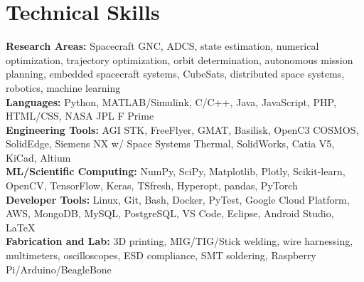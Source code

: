 \documentclass[letterpaper,11pt]{article}
\newcommand{\shiftleft}[2]{\makebox[0pt][r]{\makebox[#1][l]{#2}}}
\newcommand{\cvIcon}[1]{\BeginAccSupp{ActualText={}}#1\EndAccSupp{}}
\def\shiftleft#1#2{}%
\def\faWrench{}%
\begin{document}
\section[Technical Skills]{\shiftleft{18pt}{\cvIcon{\faWrench}}Technical Skills}
 \begin{itemize}[leftmargin=0.15in, label={}]
    \small{\item{
     \textbf{Research Areas:}{ Spacecraft GNC, ADCS, state estimation, numerical optimization, trajectory optimization, orbit determination, autonomous mission planning, embedded spacecraft systems, CubeSats, distributed space systems, robotics, machine learning} \\
     \vspace{2pt}
     \textbf{Languages:}{ Python, MATLAB/Simulink, C/C++, Java, JavaScript, PHP, HTML/CSS, NASA JPL F Prime} \\
     \vspace{2pt}
     \textbf{Engineering Tools:}{ AGI STK, FreeFlyer, GMAT, Basilisk, OpenC3 COSMOS, SolidEdge, Siemens NX w/ Space Systems Thermal, SolidWorks, Catia V5, KiCad, Altium} \\
     \vspace{2pt}
     \textbf{ML/Scientific Computing:}{ NumPy, SciPy, Matplotlib, Plotly, Scikit-learn, OpenCV, TensorFlow, Keras, TSfresh, Hyperopt, pandas, PyTorch} \\
     \vspace{2pt}
     \textbf{Developer Tools:}{ Linux, Git, Bash, Docker, PyTest, Google Cloud Platform, AWS, MongoDB, MySQL, PostgreSQL, VS Code, Eclipse, Android Studio, \LaTeX} \\
     \vspace{2pt}
     \textbf{Fabrication and Lab:}{ 3D printing, MIG/TIG/Stick welding, wire harnessing, multimeters, oscilloscopes, ESD compliance, SMT soldering, Raspberry Pi/Arduino/BeagleBone} \\
    }}
\end{itemize}
\vspace{-5pt}

\newpage
\end{document}
